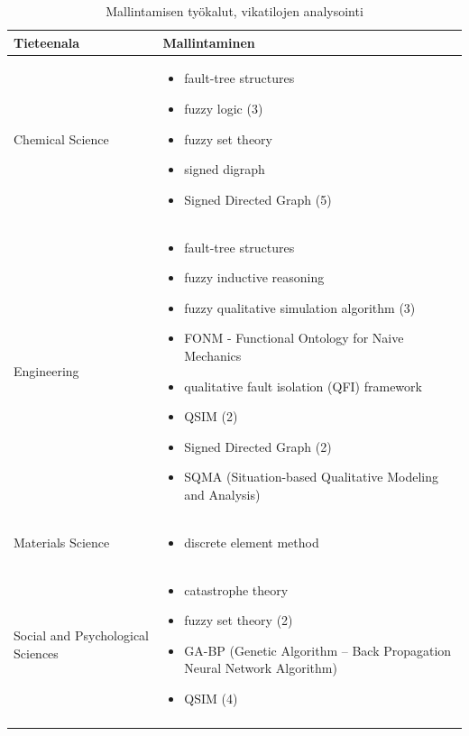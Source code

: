 \documentclass[utf8]{gradu3}
\begin{document}
\begin{longtable}[h]{|p{5cm}|p{8cm}|}
    \hline
    \textbf{Tieteenala}    &    \textbf{Mallintaminen}\\
    \hline
    Chemical Science & \begin{itemize}
        \item fault-tree structures
        \item fuzzy logic (3)
        \item fuzzy set theory
        \item signed digraph
        \item Signed Directed Graph (5)
    \end{itemize} \\
    \hline
    Engineering & \begin{itemize}
        \item fault-tree structures
        \item fuzzy inductive reasoning
        \item fuzzy qualitative simulation algorithm (3)
        \item FONM - Functional Ontology for Naive Mechanics 
        \item qualitative fault isolation (QFI) framework
        \item QSIM (2)
        \item Signed Directed Graph (2)
        \item SQMA (Situation-based Qualitative Modeling and Analysis)
    \end{itemize} \\
    \hline
    Materials Science & \begin{itemize}
        \item discrete element method
    \end{itemize} \\
    \hline
    Social and Psychological Sciences & \begin{itemize}
        \item catastrophe theory
        \item fuzzy set theory (2)
        \item GA-BP (Genetic Algorithm – Back Propagation Neural Network Algorithm)
        \item QSIM (4)
    \end{itemize} \\   
    \hline
    \caption{Mallintamisen työkalut, vikatilojen analysointi}
    \label{table:mallintaminen 2.}
\end{longtable}
\end{document}
